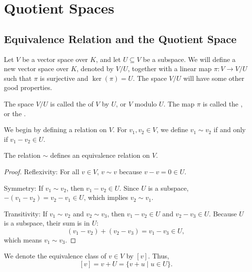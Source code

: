 \setcounter{section}{2}
\section{Quotient Spaces}

\subsection{Equivalence Relation and the Quotient Space}
Let $V$ be a vector space over $K$, and let $U \subseteq V$ be a subspace. We will define a new vector space over $K$, denoted by $V/U$, together with a linear map $\pi \colon V \to V/U$ such that $\pi$ is surjective and $\ker(\pi) = U$. The space $V/U$ will have some other good properties.

\begin{definition*} The space $V/U$ is called the  of $V$ by $U$, or $V$ modulo $U$. The map $\pi$ is called the , or the .
\end{definition*}

We begin by defining a relation on $V$. For $v_1, v_2 \in V$, we define $v_1 \sim v_2$ if and only if $v_1 - v_2 \in U$.

\begin{lemma*}
  The relation $\sim$ defines an equivalence relation on $V$.
\end{lemma*}

\begin{proof}
  Reflexivity: For all $v \in V$, $v \sim v$ because $v - v = 0 \in U$.

  Symmetry: If $v_1 \sim v_2$, then $v_1 - v_2 \in U$. Since $U$ is a subspace, $-(v_1 - v_2) = v_2 - v_1 \in U$, which implies $v_2 \sim v_1$.

  Transitivity: If $v_1 \sim v_2$ and $v_2 \sim v_3$, then $v_1 - v_2 \in U$ and $v_2 - v_3 \in U$. Because $U$ is a subspace, their sum is in $U$:
  \[ (v_1 - v_2) + (v_2 - v_3) = v_1 - v_3 \in U, \]
  which means $v_1 \sim v_3$.
\end{proof}

We denote the equivalence class of $v \in V$ by $[v]$. Thus,
\[ [v] = v + U = \{v + u \mid u \in U\}. \]

